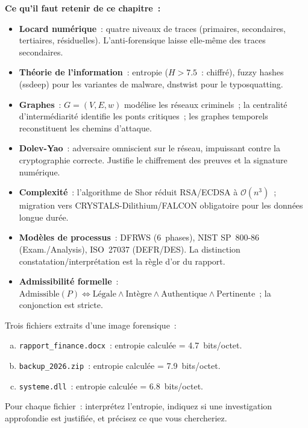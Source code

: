 \begin{boxresume}
\textbf{Ce qu'il faut retenir de ce chapitre~:}

\begin{itemize}
    \item \textbf{Locard numérique}~: quatre niveaux de traces (primaires,
          secondaires, tertiaires, résiduelles). L'anti-forensique laisse
          elle-même des traces secondaires.
    \item \textbf{Théorie de l'information}~: entropie ($H > 7.5$~: chiffré),
          fuzzy hashes (ssdeep) pour les variantes de malware, dnstwist pour
          le typosquatting.
    \item \textbf{Graphes}~: $G = (V,E,w)$ modélise les réseaux criminels~;
          la centralité d'intermédiarité identifie les ponts critiques~;
          les graphes temporels reconstituent les chemins d'attaque.
    \item \textbf{Dolev-Yao}~: adversaire omniscient sur le réseau, impuissant
          contre la cryptographie correcte. Justifie le chiffrement des preuves
          et la signature numérique.
    \item \textbf{Complexité}~: l'algorithme de Shor réduit RSA/ECDSA à
          $\mathcal{O}(n^3)$~; migration vers CRYSTALS-Dilithium/FALCON
          obligatoire pour les données longue durée.
    \item \textbf{Modèles de processus}~: DFRWS (6~phases), NIST SP~800-86
          (Exam./Analysis), ISO~27037 (DEFR/DES). La distinction
          constatation/interprétation est la règle d'or du rapport.
    \item \textbf{Admissibilité formelle}~:
          $\mathrm{Admissible}(P) \iff \mathrm{Légale} \wedge \mathrm{Intègre}
          \wedge \mathrm{Authentique} \wedge \mathrm{Pertinente}$~;
          la conjonction est stricte.
\end{itemize}
\end{boxresume}

\bigskip

\begin{boxexo}[title={\ding{45}\quad Exercice~4.1. Entropie et interprétation \niveaubase}]
Trois fichiers extraits d'une image forensique~:
\begin{enumerate}[(a)]
    \item \texttt{rapport\_finance.docx}~: entropie calculée = 4.7~bits/octet.
    \item \texttt{backup\_2026.zip}~: entropie calculée = 7.9~bits/octet.
    \item \texttt{systeme.dll}~: entropie calculée = 6.8~bits/octet.
\end{enumerate}
Pour chaque fichier~: interprétez l'entropie, indiquez si une investigation
approfondie est justifiée, et précisez ce que vous chercheriez.
\end{boxexo}

